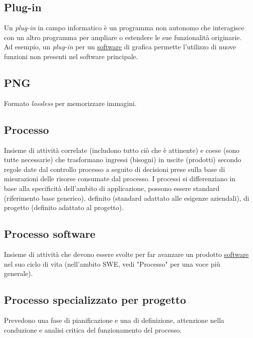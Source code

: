 	\subsection{Plug-in}
	\label{sec:plug-in}
	Un \emph{plug-in} in campo informatico è un programma non autonomo che interagisce con un altro programma per ampliare o estendere le sue funzionalità originarie. Ad esempio, un \emph{plug-in} per un \underline{\hyperref[sec:prodottosoftware]{software}} di grafica permette l'utilizzo di nuove funzioni non presenti nel software principale.


	\subsection{PNG}
	\label{sec:png}	
	Formato \emph{lossless} per memorizzare immagini.

	
	\subsection{Processo}
	\label{sec:processi}
	Insieme di attività correlate (includono tutto ciò che è attinente) e coese (sono tutte necessarie) che trasformano ingressi (bisogni) in uscite (prodotti) secondo regole date dal controllo processo a seguito di decisioni prese sulla base di misurazioni delle risorse consumate dal processo.
	I processi si differenziano in base alla specificità dell'ambito di applicazione, possono essere standard (riferimento base generico), definito (standard adattato alle esigenze aziendali), di progetto (definito adattato al progetto).

	
	\subsection{Processo software}
	\label{sec:processisoftware}
	Insieme di attività che devono essere svolte per far avanzare un prodotto \underline{\hyperref[sec:prodottosoftware]{software}} nel suo ciclo di vita (nell'ambito SWE, vedi "Processo" per una voce più generale).

	
	\subsection{Processo specializzato per progetto}
	\label{sec:processispecializzati}
	Prevedono una fase di pianificazione e una di definizione, attenzione nella conduzione e analisi critica del funzionamento del processo.

	
